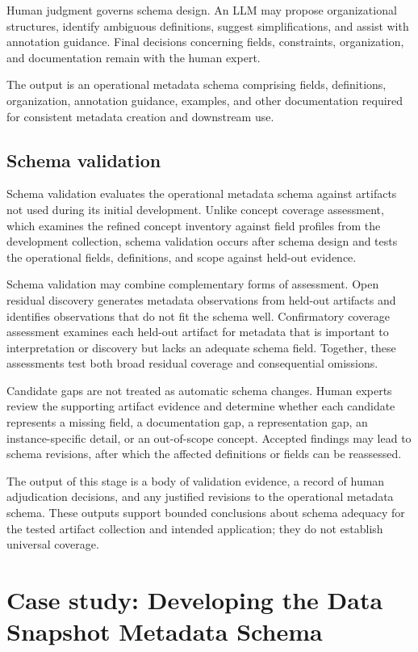 \documentclass{article}
\begin{document}
Human judgment governs schema design. An LLM may propose organizational structures, identify ambiguous definitions, suggest simplifications, and assist with annotation guidance. Final decisions concerning fields, constraints, organization, and documentation remain with the human expert.

The output is an operational metadata schema comprising fields, definitions, organization, annotation guidance, examples, and other documentation required for consistent metadata creation and downstream use.

\subsection{Schema validation}
\label{sec:schema_validation_methodology}

Schema validation evaluates the operational metadata schema against artifacts not used during its initial development. Unlike concept coverage assessment, which examines the refined concept inventory against field profiles from the development collection, schema validation occurs after schema design and tests the operational fields, definitions, and scope against held-out evidence.

Schema validation may combine complementary forms of assessment. Open residual discovery generates metadata observations from held-out artifacts and identifies observations that do not fit the schema well. Confirmatory coverage assessment examines each held-out artifact for metadata that is important to interpretation or discovery but lacks an adequate schema field. Together, these assessments test both broad residual coverage and consequential omissions.

Candidate gaps are not treated as automatic schema changes. Human experts review the supporting artifact evidence and determine whether each candidate represents a missing field, a documentation gap, a representation gap, an instance-specific detail, or an out-of-scope concept. Accepted findings may lead to schema revisions, after which the affected definitions or fields can be reassessed.

The output of this stage is a body of validation evidence, a record of human adjudication decisions, and any justified revisions to the operational metadata schema. These outputs support bounded conclusions about schema adequacy for the tested artifact collection and intended application; they do not establish universal coverage.

\section{Case study: Developing the Data Snapshot Metadata Schema}
\label{sec:case_study}
\end{document}
